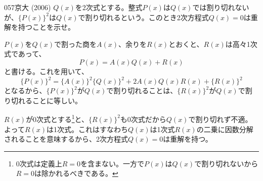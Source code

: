 \begin{thm}{057}{}{京大 (2006)}
 $Q(x)$を2次式とする。整式$P(x)$は$Q(x)$では割り切れないが、$\{P(x)\}^2$は$Q(x)$で割り切れるという。このとき2次方程式$Q(x)=0$は重解を持つことを示せ。
\end{thm}

$P(x)$を$Q(x)$で割った商を$A(x)$、余りを$R(x)$とおくと、$R(x)$は高々1次式であって、
\[ P(x)=A(x)Q(x)+R(x) \]
と書ける。これを用いて、
\[ \{P(x)\}^2=\{A(x)\}^2\{Q(x)\}^2+2A(x)Q(x)R(x)+\{R(x)\}^2 \]
となるから、$\{P(x)\}^2$が$Q(x)$で割り切れることは、$\{R(x)\}^2$が$Q(x)$で割り切れることに等しい。

$R(x)$が0次式とする\footnote{0次式は定義上$R=0$を含まない。一方で$P(x)$は$Q(x)$で割り切れないから$R=0$は除かれるべきである。}と、$\{R(x)\}^2$も0次式だから$Q(x)$で割り切れず不適。よって$R(x)$は1次式。これはすなわち$Q(x)$は1次式$R(x)$の二乗に因数分解されることを意味するから、2次方程式$Q(x)=0$は重解を持つ。